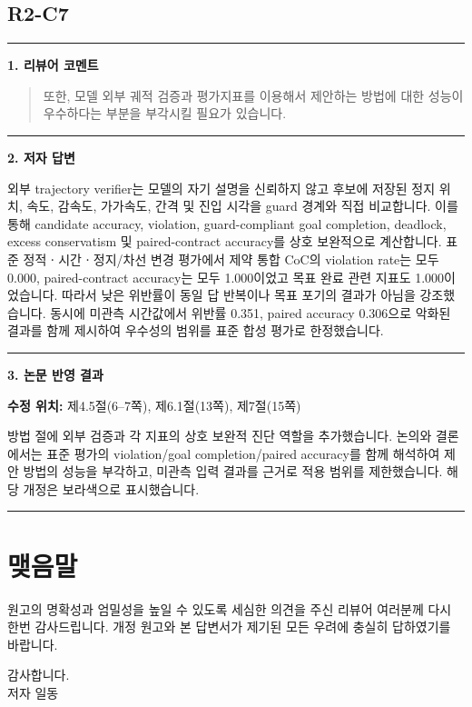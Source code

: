 \documentclass[11pt]{article}
\newcommand{\fieldheading}[2]{%
  \par\medskip\noindent
  {\color{#1}\rule{3pt}{1.25em}}\hspace{0.55em}\textbf{#2}\par\smallskip}
\newenvironment{reviewitem}[1]
  {\subsection*{#1}}
  {\par\medskip\hrule\bigskip}
\newenvironment{reviewercomment}
  {\fieldheading{reviewercolor}{1. 리뷰어 코멘트}%
   \begin{quote}}
  {\end{quote}}
\newenvironment{authorresponse}
  {\fieldheading{responsecolor}{2. 저자 답변}}
  {\par}
\newenvironment{manuscriptrevision}[1]
  {\fieldheading{revisioncolor}{3. 논문 반영 결과}%
   \textbf{수정 위치:} #1\par\smallskip}
  {\par}
\begin{document}
\begin{reviewitem}{R2-C7}
  \begin{reviewercomment}
    또한, 모델 외부 궤적 검증과 평가지표를 이용해서 제안하는 방법에 대한 성능이
    우수하다는 부분을 부각시킬 필요가 있습니다.
  \end{reviewercomment}

  \begin{authorresponse}
    외부 trajectory verifier는 모델의 자기 설명을 신뢰하지 않고 후보에 저장된
    정지 위치, 속도, 감속도, 가가속도, 간격 및 진입 시각을 guard 경계와 직접
    비교합니다. 이를 통해 candidate accuracy, violation, guard-compliant goal
    completion, deadlock, excess conservatism 및 paired-contract accuracy를 상호
    보완적으로 계산합니다. 표준 정적ㆍ시간ㆍ정지/차선 변경 평가에서 제약 통합
    CoC의 violation rate는 모두 0.000, paired-contract accuracy는 모두 1.000이었고
    목표 완료 관련 지표도 1.000이었습니다. 따라서 낮은 위반률이 동일 답 반복이나
    목표 포기의 결과가 아님을 강조했습니다. 동시에 미관측 시간값에서 위반률
    0.351, paired accuracy 0.306으로 악화된 결과를 함께 제시하여 우수성의 범위를
    표준 합성 평가로 한정했습니다.
  \end{authorresponse}

  \begin{manuscriptrevision}{제4.5절(6--7쪽), 제6.1절(13쪽), 제7절(15쪽)}
    방법 절에 외부 검증과 각 지표의 상호 보완적 진단 역할을 추가했습니다. 논의와
    결론에서는 표준 평가의 violation/goal completion/paired accuracy를 함께
    해석하여 제안 방법의 성능을 부각하고, 미관측 입력 결과를 근거로 적용 범위를
    제한했습니다. 해당 개정은 보라색으로 표시했습니다.
  \end{manuscriptrevision}
\end{reviewitem}

\section*{맺음말}

원고의 명확성과 엄밀성을 높일 수 있도록 세심한 의견을 주신 리뷰어 여러분께 다시
한번 감사드립니다. 개정 원고와 본 답변서가 제기된 모든 우려에 충실히 답하였기를
바랍니다.

감사합니다.\\
저자 일동
\end{document}
